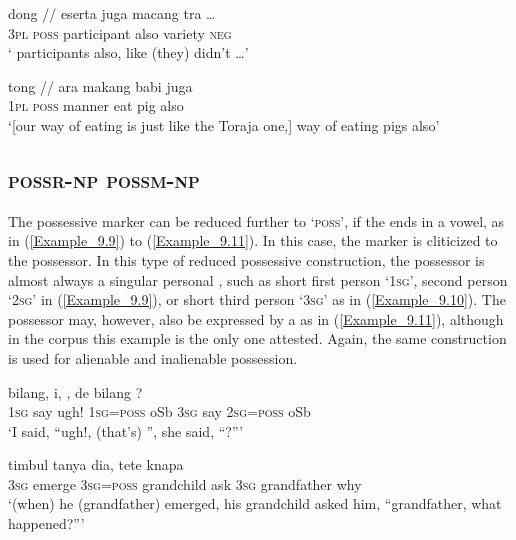 \ea
\label{Example_9.7}
\gll   dong  \textup{//}  eserta juga  macang  tra  {\ldots}\\
 \textsc{3pl}  \textsc{poss}  participant  also  variety  \textsc{neg}  \\
\glt 
‘ participants also, like (they) didn’t {\ldots}’ \textstyleExampleSource{[081025-009a-Cv.0132]}
\z

\ea
\label{Example_9.8}
\gll {\ldots} {tong} \textup{//} {ara} {makang} {babi} {juga}\\ %
 { }  \textsc{1pl}  \textsc{poss}  manner  eat  pig  also\\
\glt
‘[our way of eating is just like the Toraja one,]  way of eating pigs also’ \textstyleExampleSource{[081014-017-CvPr.0053]}
\z


\subsection{\textsc{possr-np}  \textsc{possm-np}}
\label{Para_9.1.2}
The possessive marker can be reduced further to  ‘\textsc{poss}’, if the  ends in a vowel, as in (\ref{Example_9.9}) to (\ref{Example_9.11}). In this case, the marker is cliticized to the possessor. In this type of reduced possessive construction, the possessor is almost always a singular personal , such as short first person  ‘\textsc{1sg}’, second person  ‘\textsc{2sg}’ in (\ref{Example_9.9}), or short third person  ‘\textsc{3sg}’ as in (\ref{Example_9.10}). The possessor may, however, also be expressed by a  as in (\ref{Example_9.11}), although in the corpus this example is the only one attested. Again, the same construction is used for alienable and inalienable possession.


\ea
\label{Example_9.9}
 {bilang,} {i,} {} {,} {de} {bilang} {} {}?\\ %
 \textsc{1sg}  say  ugh!  \textsc{1sg=poss}  oSb  \textsc{3sg}  say  \textsc{2sg=poss}  oSb\\
\glt 
‘I said, ``ugh!, (that’s) '', she said, ``?''' \textstyleExampleSource{[080919-006-CvNP.0026]}
\z

\ea
\label{Example_9.10}
 {timbul} {} {} {tanya} {dia,} {tete} {knapa}\\ %
 \textsc{3sg}  emerge  \textsc{3sg=poss}  grandchild  ask  \textsc{3sg}  grandfather  why\\
\glt 
‘(when) he (grandfather) emerged, his grandchild asked him, ``grandfather, what happened?''' \textstyleExampleSource{[081109-005-JR.0009]}
\z

